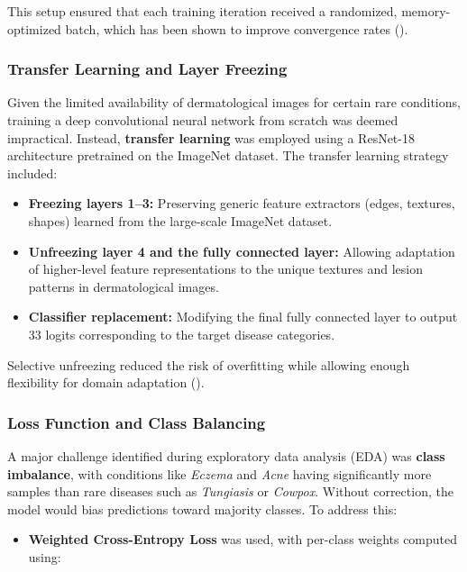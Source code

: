 \documentclass[
  12pt,
  oneside]{article}
\providecommand{\tightlist}{%
  \setlength{\itemsep}{0pt}\setlength{\parskip}{0pt}}
\begin{document}
This setup ensured that each training iteration received a randomized,
memory-optimized batch, which has been shown to improve convergence
rates ().

\subsubsection{Transfer Learning and Layer
Freezing}\label{transfer-learning-and-layer-freezing}

Given the limited availability of dermatological images for certain rare
conditions, training a deep convolutional neural network from scratch
was deemed impractical. Instead, \textbf{transfer learning} was employed
using a ResNet-18 architecture pretrained on the ImageNet dataset. The
transfer learning strategy included:

\begin{itemize}
\tightlist
\item
  \textbf{Freezing layers 1--3:} Preserving generic feature extractors
  (edges, textures, shapes) learned from the large-scale ImageNet
  dataset.
\item
  \textbf{Unfreezing layer 4 and the fully connected layer:} Allowing
  adaptation of higher-level feature representations to the unique
  textures and lesion patterns in dermatological images.
\item
  \textbf{Classifier replacement:} Modifying the final fully connected
  layer to output 33 logits corresponding to the target disease
  categories.
\end{itemize}

Selective unfreezing reduced the risk of overfitting while allowing
enough flexibility for domain adaptation
().

\subsubsection{Loss Function and Class
Balancing}\label{loss-function-and-class-balancing-1}

A major challenge identified during exploratory data analysis (EDA) was
\textbf{class imbalance}, with conditions like \emph{Eczema} and
\emph{Acne} having significantly more samples than rare diseases such as
\emph{Tungiasis} or \emph{Cowpox}. Without correction, the model would
bias predictions toward majority classes. To address this:

\begin{itemize}
\tightlist
\item
  \textbf{Weighted Cross-Entropy Loss} was used, with per-class weights
  computed using:
\end{itemize}
\end{document}
